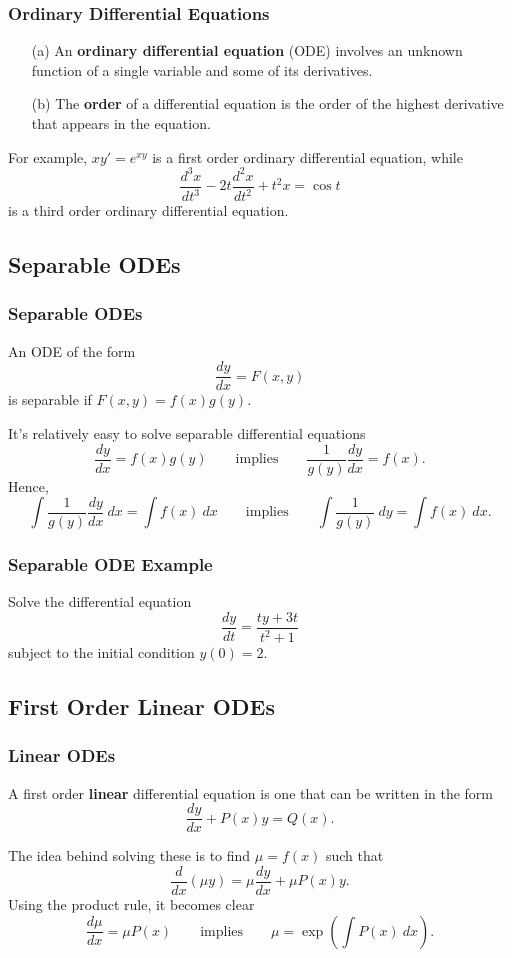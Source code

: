 \documentclass{beamer}
\begin{document}
\begin{frame}
\frametitle{Ordinary Differential Equations}

\begin{Definition}
\begin{enumerate}
\item[(a)] An {\bf ordinary differential equation} (ODE) involves an unknown function of a single variable and some of its derivatives. 
\item[(b)] The {\bf order} of a differential equation is the order of the highest derivative that appears in the equation.
\end{enumerate}
\end{Definition} 
For example, $x y' = e^{xy}$ is a first order ordinary differential equation, while
$$
\frac{d^3 x}{dt^3} - 2t\dfrac{d^2x}{dt^2} + t^2 x = \cos t
$$
is a third order ordinary differential equation.

\end{frame}

\subsection{Separable ODEs}

\begin{frame}
\frametitle{Separable ODEs}
\begin{Definition}
An ODE of the form
$$
\frac{dy}{dx} = F(x, y)
$$
is separable if $F(x, y) = f(x) g(y)$.
\end{Definition}
It's relatively easy to solve separable differential equations 
$$
\frac{dy}{dx} =  f(x) g(y)\qquad\text{implies}\qquad \frac{1}{g(y)} \frac{dy}{dx}  = f(x).
$$
Hence,
$$
\int \frac{1}{g(y)} \frac{dy}{dx}\ dx = \int f(x)\ dx\qquad\text{implies}\qquad \int \frac{1}{g(y)}\ dy = \int f(x)\ dx.
$$
\end{frame}

\begin{frame}[t]
\frametitle{Separable ODE Example}
\small
\begin{Example}
Solve the differential equation
$$
\frac{dy}{dt} = \frac{ty + 3t}{t^2 + 1}
$$
subject to the initial condition $y(0) = 2$.
\end{Example}
\end{frame}

\subsection{First Order Linear ODEs}
\begin{frame}
\frametitle{Linear ODEs}
\begin{Definition}
A first order {\bf linear} differential equation is one that can be written in the form
$$
\frac{dy}{dx} + P(x) y = Q(x).
$$
\end{Definition}
The idea behind solving these is to find $\mu = f(x)$ such that
$$
\frac{d}{dx}\left(\mu y\right) = \mu \frac{dy}{dx} + \mu P(x) y.
$$
Using the product rule, it becomes clear
$$
\frac{d\mu}{dx} = \mu P(x)\qquad\text{implies}\qquad \mu = \exp\left(\int P(x)\ dx\right).
$$
\end{frame}
\end{document}
